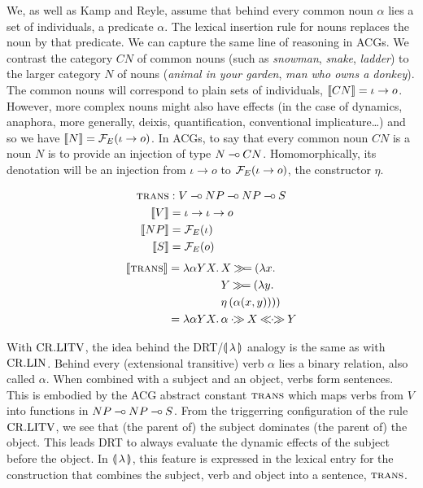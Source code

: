 \vspace{6mm}

We, as well as Kamp and Reyle, assume that behind every common noun
$\alpha$ lies a set of individuals, a predicate $\alpha$. The lexical
insertion rule for nouns replaces the noun by that predicate. We can
capture the same line of reasoning in ACGs. We contrast the category $CN$
of common nouns (such as \emph{snowman}, \emph{snake}, \emph{ladder}) to
the larger category $N$ of nouns (\emph{animal in your garden}, \emph{man
  who owns a donkey}). The common nouns will correspond to plain sets of
individuals, $\llbracket CN \rrbracket = \iota \to o$. However, more complex nouns might
also have effects (in the case of dynamics, anaphora, more generally,
deixis, quantification, conventional implicature\ldots) and so we have
$\llbracket N \rrbracket = \mathcal{F}_E(\iota \to o)$. In ACGs, to say that every common noun $CN$
is a noun $N$ is to provide an injection of type $N \mathbin{{-}\mkern-3.5mu{\circ}}
CN$. Homomorphically, its denotation will be an injection from
$\iota \to o$ to $\mathcal{F}_E(\iota \to o)$, the constructor $\eta$.

\vspace{6mm}

\begin{minipage}{0.5\textwidth}
\crlitvbox
\end{minipage}
\begin{minipage}{0.5\textwidth}
\begin{align*}
\textsc{trans} &: V \mathbin{{-}\mkern-3.5mu{\circ}} NP \mathbin{{-}\mkern-3.5mu{\circ}} NP \mathbin{{-}\mkern-3.5mu{\circ}} S \\
\llbracket V \rrbracket &= \iota \to \iota \to o \\
\llbracket NP \rrbracket &= \mathcal{F}_E(\iota) \\
\llbracket S \rrbracket &= \mathcal{F}_E(o)
\end{align*}
\begin{align*}
\sem{\abs{trans}} = \lam{\alpha Y X}{&X \hsbind (\lam{x}{ \\
                                     &Y \hsbind (\lam{y}{ \\
                                     &\etaE{(\alpha(x, y))}})})} \\
                  = \lam{\alpha Y X}{&\alpha \apr X \aplr Y}
\end{align*}
\end{minipage}

\vspace{6mm}

With $\mathrm{CR.LITV}$, the idea behind the DRT/$\llparenthesis \, \lambda \, \rrparenthesis$ analogy is the
same as with $\mathrm{CR.LIN}$. Behind every (extensional transitive) verb $\alpha$
lies a binary relation, also called $\alpha$. When combined with a subject
and an object, verbs form sentences. This is embodied by the ACG abstract
constant $\textsc{trans}$ which maps verbs from $V$ into functions in
$NP \mathbin{{-}\mkern-3.5mu{\circ}} NP \mathbin{{-}\mkern-3.5mu{\circ}} S$. From the triggerring configuration of the rule
$\mathrm{CR.LITV}$, we see that (the parent of) the subject dominates (the parent
of) the object. This leads DRT to always evaluate the dynamic effects of
the subject before the object. In $\llparenthesis \, \lambda \, \rrparenthesis$, this feature is
expressed in the lexical entry for the construction that combines the
subject, verb and object into a sentence, $\textsc{trans}$.


